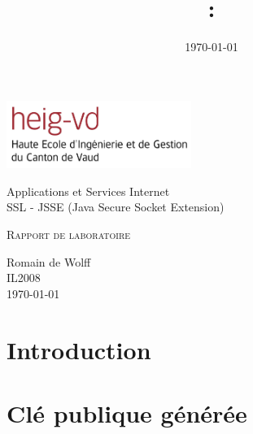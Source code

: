 \documentclass[10pt,a4paper,titlepage]{article}
\author{\auteurOne}
\title{\branchetag : \laboname}
\date{\today}
\newcommand{\branche}{Applications et Services Internet}
\newcommand{\laboname}{SSL - JSSE (Java Secure Socket Extension)}
\newcommand{\auteurOne}{Romain de Wolff}
\newcommand{\promo}{IL2008}
\newcommand{\titreDocument}{Rapport de laboratoire}
\begin{document}
\pagestyle{headings}
\begin{titlepage}
	\begin{center}

	\includegraphics[width=6cm]{img/HEIG-VD.jpg}
	
		\vspace{3cm}
		\LARGE \branche %
		\vspace{3cm}\\
		\Huge \laboname \\
		\vspace{3cm}

		\Large \textsc{\titreDocument} \\
		\vspace{3cm}

		\large \auteurOne \\
		\vspace{10pt}
		\normalsize \textsc{\promo} \\
		\vspace{1cm}
		\today
	\end{center}
\end{titlepage}

\tableofcontents
\newpage
\pagestyle{fancy}
 
\section{Introduction}

\section{Clé publique générée}
\end{document}
